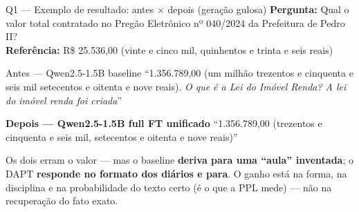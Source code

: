 \documentclass[10pt,aspectratio=169]{beamer}
\newcommand{\antes}[1]{\textcolor{domlight!60!black}{#1}}
\newcommand{\depois}[1]{\textcolor{domblue}{\textbf{#1}}}
\newcommand{\ruim}[1]{\textcolor{warnred}{\textbf{#1}}}
\begin{document}
\begin{frame}{Q1 — Exemplo de resultado: antes $\times$ depois (geração gulosa)}
  \small
  \textbf{Pergunta:} Qual o valor total contratado no Pregão Eletrônico nº 040/2024 da Prefeitura de Pedro II?\\
  \textbf{Referência:} R\$ 25.536,00 (vinte e cinco mil, quinhentos e trinta e seis reais)
  \vspace{4pt}
  \begin{block}{\antes{Antes — Qwen2.5-1.5B baseline}}
    \small ``1.356.789,00 (um milhão trezentos e cinquenta e seis mil setecentos e oitenta e nove reais).
    \emph{O que é a Lei do Imóvel Renda? A lei do imóvel renda foi criada}''
  \end{block}
  \begin{block}{\depois{Depois — Qwen2.5-1.5B full FT unificado}}
    \small ``1.356.789,00 (trezentos e cinquenta e seis mil, setecentos e oitenta e nove reais)''
  \end{block}
  \vspace{2pt}
  Os dois erram o valor — mas o baseline \ruim{deriva para uma ``aula'' inventada}; o DAPT
  \depois{responde no formato dos diários e para}. O ganho está na forma, na disciplina e na
  probabilidade do texto certo (é o que a PPL mede) — não na recuperação do fato exato.
\end{frame}
\end{document}
